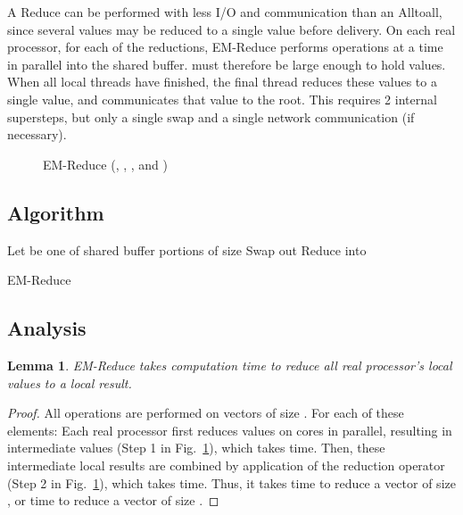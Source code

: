\documentclass[12pt]{carletoncsthesis}
\newtheorem{lemma}[thm]{Lemma}
\begin{document}
A Reduce can be performed with less I/O and communication than an Alltoall,
since several values may be reduced to a single value before delivery.
On each real processor, for each of the  reductions, {\sc EM-Reduce}
performs  operations at a time in parallel into the shared buffer.  
must therefore be large enough to hold  values.  When all local threads
have finished, the final thread reduces these  values to a single value,
and communicates that value to the root.  This requires 2 internal supersteps,
but only a single swap and a single network communication (if necessary).

\begin{figure}[h]
\begin{center}
\caption{{\sc EM-Reduce} (, , , and )}
\label{em-reduce-diag}
\end{center}
\end{figure}


\clearpage
\subsection{Algorithm}


\begin{algorithm}[h]
\BlankLine
Let  be one of  shared buffer portions of size \;
\BlankLine
{}
	Swap out\;
	Reduce  into \;
\BlankLine{}
\BlankLine
{}
\BlankLine{}\BlankLine
\caption{{\sc EM-Reduce}}
\label{em-reduce}
\end{algorithm}


\subsection{Analysis}


\begin{lemma}
\label{em-reduce-cpu}
{\sc EM-Reduce} takes  computation time to
reduce all real processor's local values to a local result.
\end{lemma}
\begin{proof}
All operations are performed on vectors of size .  For each of these
 elements: Each real processor first reduces  values on
 cores in parallel, resulting in  intermediate values (Step 1 in
Fig.~\ref{em-reduce-diag}), which takes  time.  Then, these
 intermediate local results are combined by application of the reduction
operator (Step 2 in Fig.~\ref{em-reduce-diag}), which takes  time.
Thus, it takes  time to reduce a vector of size ,
or  time to reduce a vector of size .
\end{proof}
\end{document}
